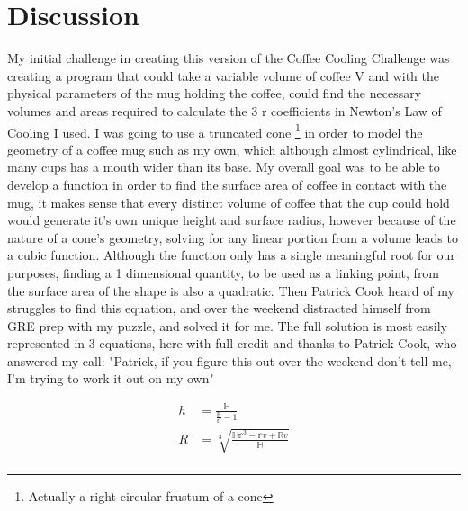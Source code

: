 \documentclass[12pt]{article}
\begin{document}
\section{Discussion}
My initial challenge in creating this version of the Coffee Cooling Challenge was creating a program that could take a variable volume of coffee V and with the physical parameters of the mug holding the coffee, could find the necessary volumes and areas required to calculate the 3 r coefficients in Newton's Law of Cooling I used. I was going to use a truncated cone
\footnote{Actually a right circular frustum of a cone}
in order to model the geometry of a coffee mug such as my own, which although almost cylindrical, like many cups has a mouth wider than its base. My overall goal was to be able to develop a function in order to find the surface area of coffee in contact with the mug, it makes sense that every distinct volume of coffee that the cup could hold would generate it's own unique height and surface radius, however because of the nature of a cone's geometry, solving for any linear portion from a volume leads to a cubic function. Although the function only has a single meaningful root for our purposes, finding a 1 dimensional quantity, to be used as a linking point, from the surface area of the shape is also a quadratic. Then Patrick Cook heard of my struggles to find this equation, and over the weekend distracted himself from GRE prep with my puzzle, and solved it for me. The full solution is most easily represented in 3 equations, here with full credit and thanks to Patrick Cook, who answered my call: "Patrick, if you figure this out over the weekend don't tell me, I'm trying to work it out on my own"

\begin{equation}
\begin{aligned}
h &= \frac{\mathbb{H}}{\frac{\mathbb{R}}{\mathbb{r}} - 1} \\
R &= \sqrt[3]{\frac{\mathbb{H}\mathbb{r}^3 - \mathbb{r}v + \mathbb{R}v}{\mathbb{H}}} \\
\end{aligned}
\end{equation}
\end{document}
